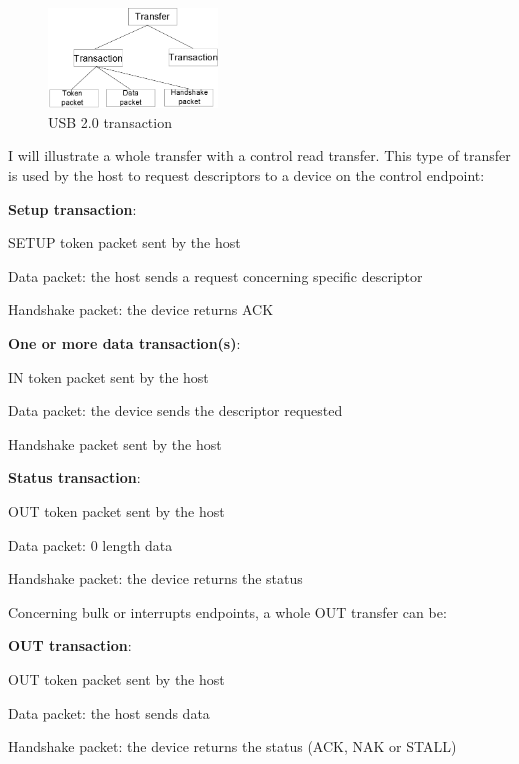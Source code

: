 \documentclass[pdftex,10pt,a4paper]{report}
\newenvironment{packed_item}{
\begin{itemize}
  \setlength{\itemsep}{1pt}
  \setlength{\parskip}{0pt}
  \setlength{\parsep}{0pt}
}{\end{itemize}}
\begin{document}
\begin{figure}[h!]
		\centering
		\includegraphics[width=0.4\textwidth]{./transfer.jpg}
		\caption{USB 2.0 transaction}
		\label{USB 2.0 transaction}
\end{figure}

I will illustrate a whole transfer with a control read transfer. This type of transfer is used by the host to request descriptors to a device on the control endpoint:
\begin{packed_item}
	\item \textbf{Setup transaction}:
	\begin{packed_item}
		\item SETUP token packet sent by the host
		\item Data packet: the host sends a request concerning specific descriptor
		\item Handshake packet: the device returns ACK
	\end{packed_item}
	
	\item \textbf{One or more data transaction(s)}:
	\begin{packed_item}
		\item IN token packet sent by the host
		\item Data packet: the device sends the descriptor requested
		\item Handshake packet sent by the host
	\end{packed_item}
	
	
	\item \textbf{Status transaction}:
	\begin{packed_item}
		\item OUT token packet sent by the host
		\item Data packet: 0 length data
		\item Handshake packet: the device returns the status
	\end{packed_item}
	
\end{packed_item}


Concerning bulk or interrupts endpoints, a whole OUT transfer can be:
\begin{packed_item}
	\item \textbf{OUT transaction}:
	\begin{packed_item}
		\item OUT token packet sent by the host
		\item Data packet: the host sends data
		\item Handshake packet: the device returns the status (ACK, NAK or STALL)
	\end{packed_item}
\end{packed_item}
\end{document}
